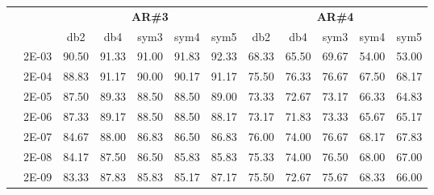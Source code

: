\begin{table}[H]
\begin{tabular}{|c|c|c c c c c|c c c c c|}
\cline{3-12}
\multicolumn{2}{c}{} & \multicolumn{5}{|c|}{\textbf{AR\#3}}  & \multicolumn{5}{c|}{\textbf{AR\#4}} \\\cline{3-12}
\multicolumn{2}{c}{}  & \multicolumn{1}{|c}{db2} & db4 & sym3 & sym4 & sym5 & db2 & db4& sym3 & sym4 & sym5 \\\hline
\multicolumn{1}{|c|}{ \multirow{6}{*}{\rotatebox[origin=c]{90}{\textbf{Gamma}}} }
&2E-03&	90.50&	91.33&	91.00&	91.83&	92.33&	68.33&	65.50&	69.67&	54.00&	53.00	\\\cline{2-12}
&2E-04&	88.83&	91.17&	90.00&	90.17&	91.17&	75.50&	76.33&	76.67&	67.50&	68.17	\\\cline{2-12}
&2E-05&	87.50&	89.33&	88.50&	88.50&	89.00&	73.33&	72.67&	73.17&	66.33&	64.83	\\\cline{2-12}
&2E-06&	87.33&	89.17&	88.50&	88.50&	88.17&	73.17&	71.83&	73.33&	65.67&	65.17	\\\cline{2-12}
&2E-07&	84.67&	88.00&	86.83&	86.50&	86.83&	76.00&	74.00&	76.67&	68.17&	67.83	\\\cline{2-12}
&2E-08&	84.17&	87.50&	86.50&	85.83&	85.83&	75.33&	74.00&	76.50&	68.00&	67.00	\\\cline{2-12}
&2E-09&	83.33&	87.83&	85.83&	85.17&	87.17&	75.50&	72.67&	75.67&	68.33&	66.00	
		
\\\midrule
\end{tabular}

\end{table}


